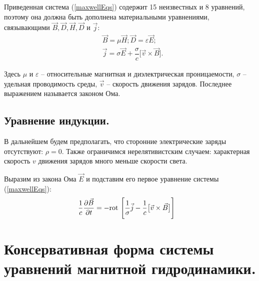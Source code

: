 \documentclass[14pt, a4paper, fleqn]{extreport}
\begin{document}
	Приведенная система (\ref{maxwellEqs}) содержит 15 неизвестных
	и 8 уравнений, поэтому она должна быть дополнена материальными 
	уравнениями, связывающими $\vec{B}, \vec{D}, \vec{H}, \vec{D}$ и
	$\vec{j}$:
	\begin{equation} \label{maxwellMaterialEqs}
	\begin{split}
	&\vec{B} = \mu\vec{H}; \vec{D} = \varepsilon\vec{E};
	\\
	&\vec{j} = \sigma\vec{E} + \dfrac{\sigma}{c}\big[\vec{v}\times\vec{B}\big].
	\end{split}
	\end{equation}
	
	Здесь 
	$\mu$ и $\varepsilon$ -- относительные магнитная и диэлектрическая проницаемости,
	$\sigma$ -- удельная проводимость среды,
	$\vec{v}$ -- скорость движения зарядов.
	Последнее выражением называется законом Ома.
	
	\subsection{Уравнение индукции.}
	
	В дальнейшем будем предполагать, 
	что сторонние электрические заряды отсутствуют: $\rho = 0$.
	Также ограничимся нерелятивистским случаем:
	характерная скорость $v$ движения зарядов много меньше скорости света.
	
	Выразим из закона Ома $\vec{E}$ 
	и подставим его первое уравнение системы (\ref{maxwellEqs}):
	\begin{equation*}
	\begin{split}
	&\dfrac{1}{c}\dfrac{\partial\vec{B}}{\partial t} = 
	- \text{rot }\Bigg[\dfrac{1}{\sigma}\vec{j} - \dfrac{1}{c}\big[\vec{v}\times\vec{B}\big]\Bigg]
	\end{split}
	\end{equation*}
	
	\section{Консервативная форма системы уравнений магнитной гидродинамики.}

\end{document}
